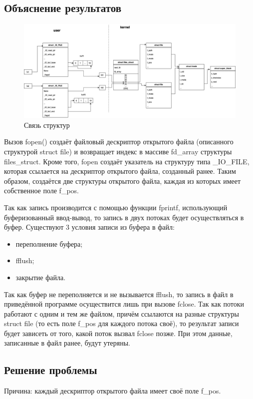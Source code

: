\documentclass[12pt]{report}
\begin{document}
\subsection*{Объяснение результатов}
\begin{figure}[H]
	\centering
	\includegraphics[scale=0.37]{os_lab_05-3.jpg}
	\caption{Связь структур}
	\label{fig:1}
\end{figure}
Вызов fopen() создаёт файловый дескриптор открытого файла (описанного структурой struct file) и возвращает индекс в массиве fd\_array структуры files\_struct. Кроме того, fopen создаёт указатель на структуру типа \_IO\_FILE, которая ссылается на дескриптор открытого файла, созданный ранее. Таким образом, создаётся две структуры открытого файла, каждая из которых имеет собственное поле f\_pos. 

Так как запись производится с помощью функции fprintf, использующий буферизованный ввод-вывод, то запись в двух потоках будет осуществляться в буфер. Существуют 3 условия записи из буфера в файл:
\begin{itemize}
    \item переполнение буфера;
    \item fflush;
    \item закрытие файла.
\end{itemize}

Так как буфер не переполняется и не вызывается fflush, то запись в файл в приведённой программе осуществится лишь при вызове fclose. Так как потоки работают с одним и тем же файлом, причём ссылаются на разные структуры struct file (то есть поле f\_pos для каждого потока своё), то результат записи будет зависеть от того, какой поток вызвал fclose позже. При этом данные, записанные в файл ранее, будут утеряны.

\subsection*{Решение проблемы}
Причина: каждый дескриптор открытого файла имеет своё поле f\_pos. 
\end{document}
